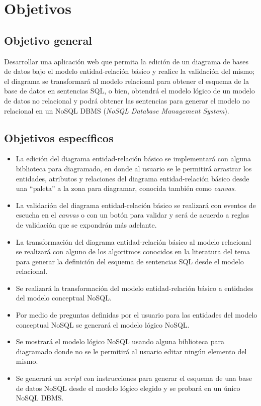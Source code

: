 \section{Objetivos}

\subsection*{Objetivo general}
Desarrollar una aplicación web que permita la edición de un diagrama de bases de datos bajo el modelo entidad-relación básico y realice la validación del mismo; el diagrama se transformará  al modelo relacional para obtener el esquema de la base de datos en sentencias SQL, o bien, obtendrá el modelo lógico de un modelo de datos no relacional y podrá obtener las sentencias para generar el modelo no relacional en un NoSQL DBMS (\textit{NoSQL Database Management System}).

\subsection*{Objetivos específicos}\label{sec:objSpecifics}

\begin{itemize}
    \item La edición del diagrama entidad-relación básico se implementará con alguna biblioteca para diagramado, en donde al usuario se le permitirá arrastrar los entidades, atributos y relaciones del diagrama entidad-relación básico desde una ``paleta''  a la zona para diagramar, conocida también como \textit{canvas}.
    \item La validación del diagrama entidad-relación básico se realizará con eventos de escucha en el \textit{canvas} o con un botón para validar y será de acuerdo a reglas de validación que se expondrán más adelante.
    \item La transformación del diagrama entidad-relación básico al modelo relacional se realizará con alguno de los algoritmos conocidos en la literatura del tema para generar la definición del esquema de sentencias SQL desde el modelo relacional.
    \item Se realizará la transformación del modelo entidad-relación básico a entidades del modelo conceptual NoSQL.
    \item Por medio de preguntas definidas por el usuario para las entidades del modelo conceptual NoSQL se generará el modelo lógico NoSQL.
    \item Se mostrará el modelo lógico NoSQL usando alguna biblioteca para diagramado donde no se le permitirá al usuario editar ningún elemento del mismo.
    \item Se generará un \textit{script} con instrucciones para generar el esquema de una base de datos NoSQL desde el modelo lógico elegido y se probará en un único NoSQL DBMS.
\end{itemize}
